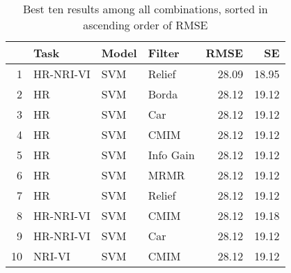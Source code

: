\begin{table}[ht!]
\centering
\caption{Best ten results among all combinations, sorted in ascending order of RMSE} 
\label{tab:perf-top-10}
\begin{tabular}{rlllrr}
  \hline
 & Task & Model & Filter & RMSE & SE \\ 
  \hline
1 & HR-NRI-VI & SVM & Relief & 28.09 & 18.95 \\ 
  2 & HR & SVM & Borda & 28.12 & 19.12 \\ 
  3 & HR & SVM & Car & 28.12 & 19.12 \\ 
  4 & HR & SVM & CMIM & 28.12 & 19.12 \\ 
  5 & HR & SVM & Info Gain & 28.12 & 19.12 \\ 
  6 & HR & SVM & MRMR & 28.12 & 19.12 \\ 
  7 & HR & SVM & Relief & 28.12 & 19.12 \\ 
  8 & HR-NRI-VI & SVM & CMIM & 28.12 & 19.18 \\ 
  9 & HR-NRI-VI & SVM & Car & 28.12 & 19.12 \\ 
  10 & NRI-VI & SVM & CMIM & 28.12 & 19.12 \\ 
   \hline
\end{tabular}
\end{table}
